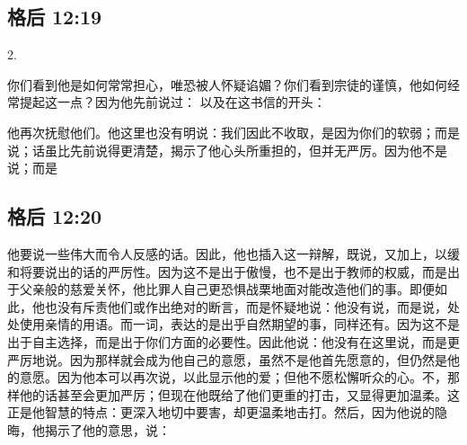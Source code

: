 
\subsection{格后 12:19}

2. \par

你们看到他是如何常常担心，唯恐被人怀疑谄媚？你们看到宗徒的谨慎，他如何经常提起这一点？因为他先前说过： 以及在这书信的开头：\par

 他再次抚慰他们。他这里也没有明说：我们因此不收取，是因为你们的软弱；而是说；话虽比先前说得更清楚，揭示了他心头所重担的，但并无严厉。因为他不是说；而是\par


\subsection{格后 12:20}

\par

他要说一些伟大而令人反感的话。因此，他也插入这一辩解，既说，又加上，以缓和将要说出的话的严厉性。因为这不是出于傲慢，也不是出于教师的权威，而是出于父亲般的慈爱关怀，他比罪人自己更恐惧战栗地面对能改造他们的事。即便如此，他也没有斥责他们或作出绝对的断言，而是怀疑地说：他没有说，而是说，处处使用亲情的用语。而一词，表达的是出乎自然期望的事，同样还有。因为这不是出于自主选择，而是出于你们方面的必要性。因此他说：他没有在这里说，而是更严厉地说。因为那样就会成为他自己的意愿，虽然不是他首先愿意的，但仍然是他的意愿。因为他本可以再次说，以此显示他的爱；但他不愿松懈听众的心。不，那样他的话甚至会更加严厉；但现在他既给了他们更重的打击，又显得更加温柔。这正是他智慧的特点：更深入地切中要害，却更温柔地击打。然后，因为他说的隐晦，他揭示了他的意思，说：\par

